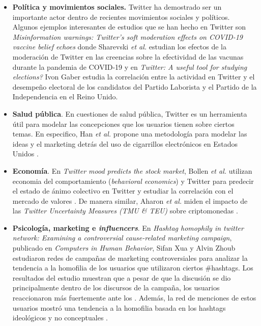 \begin{itemize}

    \item \textbf{Política y movimientos sociales.} Twitter ha demostrado ser un importante actor dentro de recientes movimientos sociales y políticos. Algunos ejemplos interesantes de estudios que se han hecho en Twitter son \textit{Misinformation warnings: Twitter’s soft moderation effects on COVID-19 vaccine belief echoes} donde Sharevski \textit{et al.} estudian los efectos de la moderación de Twitter en las creencias sobre la efectividad de las vacunas durante la pandemia de COVID-19 \cite{sharevski_misinformation_2022} y en \textit{Twitter: A useful tool for studying elections?} Ivon Gaber estudia la correlación entre la actividad en Twitter y el desempeño electoral de los candidatos del Partido Laborista y el Partido de la Independencia en el Reino Unido. \cite{gaber_twitter_2017}

    \item \textbf{Salud pública}. En cuestiones de salud pública, Twitter es un herramienta útil para modelar las concepciones que los usuarios tienen sobre ciertos temas. En especifico, Han \textit{et al.} propone una metodología para modelar las ideas y el marketing detrás del uso de cigarrillos electrónicos en Estados Unidos \cite{spiro_exploratory_2016}.

    \item \textbf{Economía}. En \textit{Twitter mood predicts the stock market}, Bollen \textit{et al.} utilizan economia del comportamiento (\textit{behavioral economics}) y Twitter para predecir el estado de ánimo colectivo en Twitter y estudiar la correlación con el mercado de valores \cite{bollen_twitter_2011}. De manera similar, Aharon \textit{et al.} miden el impacto de las \textit{Twitter Uncertainty Measures (TMU \& TEU)} sobre criptomonedas \cite{aharon_twitter-based_2022}.

    \item \textbf{Psicología, marketing e \textit{influencers}}. En \textit{Hashtag homophily in twitter network: Examining a controversial cause-related marketing campaign}, publicado en \textit{Computers in Human Behavior}, Sifan Xua y Alvin Zhoub estudiaron redes de campañas de marketing controversiales para analizar la tendencia a la homofilia de los usuarios que utilizaron ciertos \#hashtags. Los resultados del estudio muestran que a pesar de que la discusión se dio principalmente dentro de los discursos de la campaña, los usuarios reaccionaron más fuertemente ante los . Además, la red de menciones de estos usuarios mostró una tendencia a la homofilia basada en los hashtags ideológicos y no conceptuales \cite{xu_hashtag_2020}.


\end{itemize}
